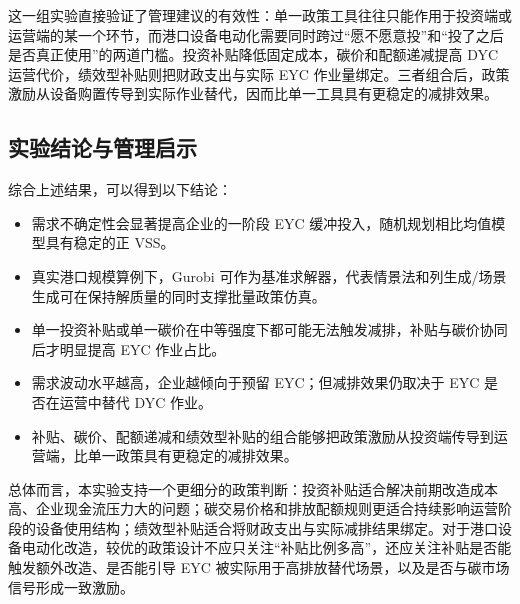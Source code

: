 \documentclass[12pt,a4paper]{article}
\newcommand{\手批注}[2]{\textcolor{#1}{\text{\kaishu #2}}}
\newcommand{\一阶段}{\textcolor{firststage}{\text{\kaishu （一阶段）}}}
\newcommand{\二阶段}{\textcolor{secondstage}{\text{\kaishu （二阶段）}}}
\begin{document}
这一组实验直接验证了管理建议的有效性：单一政策工具往往只能作用于投资端或运营端的某一个环节，而港口设备电动化需要同时跨过“愿不愿意投”和“投了之后是否真正使用”的两道门槛。投资补贴降低固定成本，碳价和配额递减提高 DYC 运营代价，绩效型补贴则把财政支出与实际 EYC 作业量绑定。三者组合后，政策激励从设备购置传导到实际作业替代，因而比单一工具具有更稳定的减排效果。

\subsection{实验结论与管理启示}

综合上述结果，可以得到以下结论：
\begin{itemize}[itemsep=0.2em,leftmargin=2em]
    \item 需求不确定性会显著提高企业的一阶段 EYC 缓冲投入，随机规划相比均值模型具有稳定的正 VSS。
    \item 真实港口规模算例下，Gurobi 可作为基准求解器，代表情景法和列生成/场景生成可在保持解质量的同时支撑批量政策仿真。
    \item 单一投资补贴或单一碳价在中等强度下都可能无法触发减排，补贴与碳价协同后才明显提高 EYC 作业占比。
    \item 需求波动水平越高，企业越倾向于预留 EYC；但减排效果仍取决于 EYC 是否在运营中替代 DYC 作业。
    \item 补贴、碳价、配额递减和绩效型补贴的组合能够把政策激励从投资端传导到运营端，比单一政策具有更稳定的减排效果。
\end{itemize}

总体而言，本实验支持一个更细分的政策判断：投资补贴适合解决前期改造成本高、企业现金流压力大的问题；碳交易价格和排放配额规则更适合持续影响运营阶段的设备使用结构；绩效型补贴适合将财政支出与实际减排结果绑定。对于港口设备电动化改造，较优的政策设计不应只关注“补贴比例多高”，还应关注补贴是否能触发额外改造、是否能引导 EYC 被实际用于高排放替代场景，以及是否与碳市场信号形成一致激励。
\end{document}

